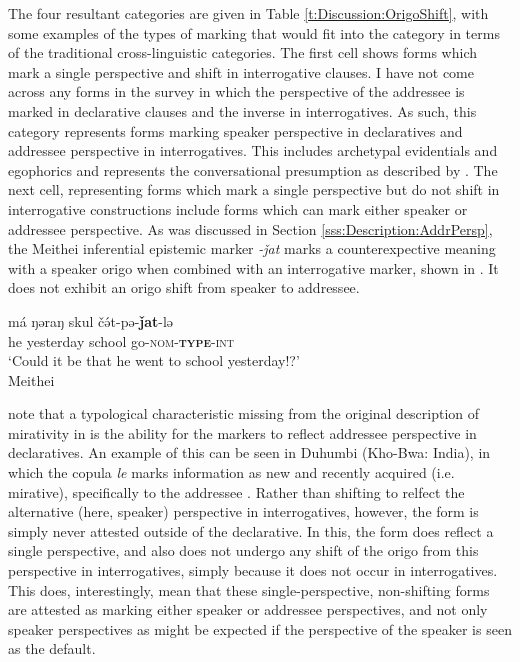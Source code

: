 The four resultant categories are given in Table \ref{t:Discussion:OrigoShift}, with some examples of the types of marking that would fit into the category in terms of the traditional cross-linguistic categories. The first cell shows forms which mark a single perspective and shift in interrogative clauses. I have not come across any forms in the survey in which the perspective of the addressee is marked in declarative clauses and the inverse in interrogatives. As such, this category represents forms marking speaker perspective in declaratives and addressee perspective in interrogatives. This includes archetypal evidentials and egophorics \cites{Aikhenvald2004}{EgoIntro} and represents the conversational presumption as described by . The next cell, representing forms which mark a single perspective but do not shift in interrogative constructions include forms which can mark either speaker or addressee perspective. As was discussed in Section \ref{sss:Description:AddrPersp}, the Meithei \cite[Internal Isolate: India,][]{Chelliah1997} inferential epistemic marker \textit{-ǰat} marks a counterexpective meaning with a speaker origo when combined with an interrogative marker, shown in . It does not exhibit an origo shift from speaker to addressee.

\begin{exe}
    \ex \label{e:Discussion:MeitheiInter}
    \gll má ŋəraŋ skul čə́t-pə-\textbf{ǰat}-lə \\
    he yesterday school go-\textsc{nom-\textbf{type}-int} \\
    \glt `Could it be that he went to school yesterday!?' \\
    Meithei \cite[Internal Isolate:India,][296]{Chelliah1997}
\end{exe}

 note that a typological characteristic missing from the original description of mirativity in  is the ability for the markers to reflect addressee perspective in declaratives. An example of this can be seen in Duhumbi (Kho-Bwa: India), in which the copula \textit{le} marks information as new and recently acquired (i.e. mirative), specifically to the addressee \cite[405]{Bodt2020}. Rather than shifting to relfect the alternative (here, speaker) perspective in interrogatives, however, the form is simply never attested outside of the declarative. In this, the form does reflect a single perspective, and also does not undergo any shift of the origo from this perspective in interrogatives, simply because it does not occur in interrogatives. This does, interestingly, mean that these single-perspective, non-shifting forms are attested as marking either speaker or addressee perspectives, and not only speaker perspectives as might be expected if the perspective of the speaker is seen as the default.

